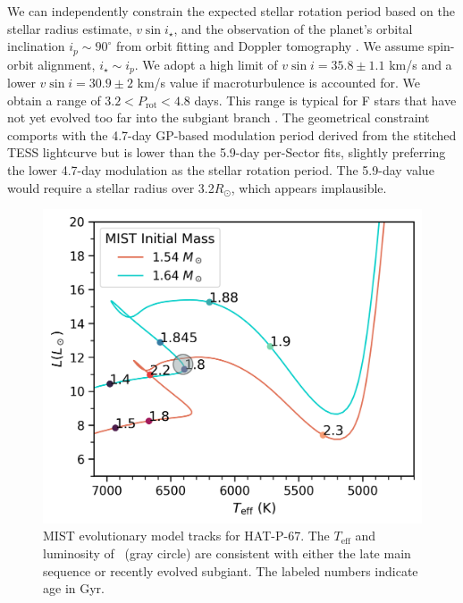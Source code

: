 \documentclass[linenumbers, twocolumn, trackchanges]{aastex631}
\newcommand{\hatp}{\object{HAT-P-67}~}
\begin{document}
We can independently constrain the expected stellar rotation period based on the stellar radius estimate, $v\sin{i_\star}$, and the observation of the planet's orbital inclination $i_p\sim90^\circ$ from orbit fitting and Doppler tomography \citep{2017AJ....153..211Z}.  We assume spin-orbit alignment, $i_\star \sim i_p$.  We adopt a high limit of $v\sin{i}=35.8\pm1.1$ km/s and a lower $v\sin{i}=30.9\pm2$ km/s value if macroturbulence is accounted for.  We obtain a range of $3.2 < P_\mathrm{rot}  < 4.8 $ days.  This range is typical for F stars that have not yet evolved too far into the subgiant branch \citep{2022ApJ...930....7A}.  The geometrical constraint comports with the 4.7-day GP-based modulation period derived from the stitched TESS lightcurve but is lower than the 5.9-day per-Sector fits, slightly preferring the lower 4.7-day modulation as the stellar rotation period.  The 5.9-day value would require a stellar radius over 3.2$R_\odot$, which appears implausible.




\begin{figure}
  \centering
  \includegraphics[width=0.98\linewidth]{MIST_only_HATP.png}
  \caption{MIST evolutionary model tracks for HAT-P-67.  The $T_\mathrm{eff}$ and luminosity of \hatp (gray circle) are consistent with either the late main sequence or recently evolved subgiant.  The labeled numbers indicate age in Gyr.}
  \label{fig:evolTracks}
\end{figure}
\end{document}
